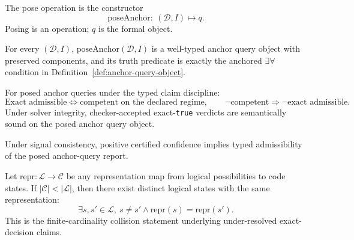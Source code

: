 \begin{definition}\label{def:pose-anchor-query}
The pose operation is the constructor
\[
\mathrm{poseAnchor}:\ (\mathcal{D},I)\mapsto q.
\]
Posing is an operation; $q$ is the formal object.
\end{definition}

\begin{proposition}\label{prop:pose-anchor-object}
For every $(\mathcal{D},I)$, $\mathrm{poseAnchor}(\mathcal{D},I)$ is a well-typed anchor query object with preserved components, and its truth predicate is exactly the anchored $\exists\forall$ condition in Definition~\ref{def:anchor-query-object}.
\end{proposition}

\begin{proposition}\label{prop:posed-anchor-typed-exact}
For posed anchor queries under the typed claim discipline:
\[
\text{Exact admissible}\iff\text{competent on the declared regime},\qquad
\neg\text{competent}\Rightarrow\neg\text{exact admissible}.
\]
Under solver integrity, checker-accepted exact-\texttt{true} verdicts are semantically sound on the posed anchor query object.
\end{proposition}

\begin{corollary}\label{cor:posed-anchor-certified-gate}
Under signal consistency, positive certified confidence implies typed admissibility of the posed anchor-query report.
\end{corollary}

\begin{proposition}\label{prop:under-resolution-collision}
Let \(\mathrm{repr} : \mathcal{L} \to \mathcal{C}\) be any representation map from logical possibilities to code states. If \(|\mathcal{C}| < |\mathcal{L}|\), then there exist distinct logical states with the same representation:
\[
\exists s,s' \in \mathcal{L},\ s \neq s' \wedge \mathrm{repr}(s)=\mathrm{repr}(s').
\]
This is the finite-cardinality collision statement underlying under-resolved exact-decision claims.
\end{proposition}

